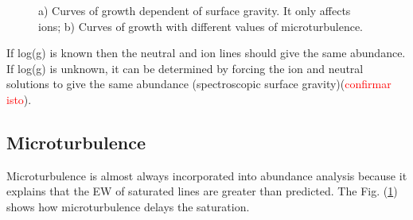 \documentclass[dvips,12pt,a4paper]{report}
\begin{document}
{\begin{figure}[h]
\centering
{}
\caption[Curves of growth dependent of surface gravity and microturbulence] {a) Curves of growth dependent of surface gravity. It only affects ions; b) Curves of growth with different values of microturbulence.} %
\label{cogpmt}
\end{figure}

If log(g) is known then the neutral and ion lines should give the same abundance. If log(g) is unknown, it can be determined by forcing the ion and neutral solutions to give the same abundance (spectroscopic surface gravity)(\textcolor{red}{confirmar isto}).

\subsection{Microturbulence}


Microturbulence is almost always incorporated into abundance analysis because it explains that the EW of saturated lines are greater than predicted. The Fig. (\ref{cogpmt}) shows how microturbulence delays the saturation. 

}
\end{document}
